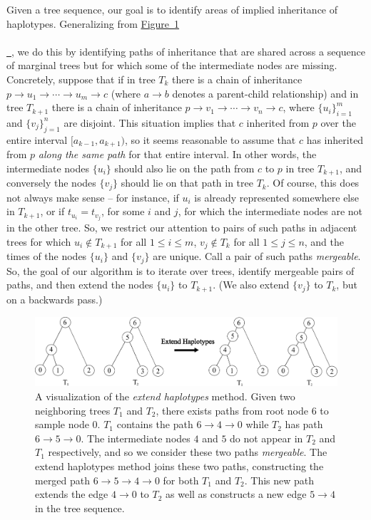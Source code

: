\documentclass[10pt,twoside,lineno]{gsajnl}
\newcommand*{\figref}[2][]{%
	\hyperref[{#2}]{%
		Figure~\ref*{#2}%
		\ifx\\#1\\%
		\else
		\,#1%
		\fi
	}%
}
\begin{document}
Given a tree sequence, our goal is to
identify areas of implied inheritance of haplotypes.
Generalizing from \figref{fig:extending_diagram},
we do this by identifying paths of inheritance that are shared across a sequence of marginal trees
but for which some of the intermediate nodes are missing.
Concretely, suppose that 
if in tree $T_k$ there is a chain of inheritance
$p \to u_1 \to \cdots \to u_m \to c$
(where $a \to b$ denotes a parent-child relationship)
and in tree $T_{k+1}$ there is a chain of inheritance
$p \to v_1 \to \cdots \to v_n \to c$,
where $\{u_i\}_{i=1}^m$ and $\{v_j\}_{j=1}^n$ are disjoint.
This situation implies that $c$ inherited from $p$ over the entire interval $[a_{k-1}, a_{k+1})$,
so it seems reasonable to assume that $c$ has inherited from $p$ \emph{along the same path} for that entire interval.
In other words, the intermediate nodes $\{u_i\}$ should also lie on the path from $c$ to $p$ in tree $T_{k+1}$,
and conversely the nodes $\{v_j\}$ should lie on that path in tree $T_k$.
Of course, this does not always make sense --
for instance, if $u_i$ is already represented somewhere else in $T_{k+1}$,
or if $t_{u_i} = t_{v_j}$, for some $i$ and $j$,
for which the intermediate nodes are not in the other tree.
So, we restrict our attention to pairs of such paths in adjacent trees
for which
$u_i \notin T_{k+1}$ for all $1 \le i \le m$,
$v_j \notin T_k$ for all $1 \le j \le n$,
and the times of the nodes $\{u_i\}$ and $\{v_j\}$ are unique.
Call a pair of such paths \emph{mergeable}.
So, the goal of our algorithm is to iterate over trees,
identify mergeable pairs of paths,
and then extend the nodes $\{u_i\}$ to $T_{k+1}$.
(We also extend $\{v_j\}$ to $T_k$, but on a backwards pass.)

\begin{figure}[!ht]
\begin{center}
	\includegraphics[width=5in]{edge_extend_method.pdf}
\end{center}
\caption{A visualization of the \textit{extend haplotypes} method. Given two neighboring trees $T_1$ and $T_2$, there exists paths from root node $6$ to sample node $0$. $T_1$ contains the path $6\to 4\to 0$ while $T_2$ has path $6\to 5\to 0$. The intermediate nodes $4$ and $5$ do not appear in $T_2$ and $T_1$ respectively, and so we consider these two paths \textit{mergeable}. The extend haplotypes method joins these two paths, constructing the merged path $6\to 5\to 4\to 0$ for both $T_1$ and $T_2$. This new path extends the edge $4\to 0$ to $T_2$ as well as constructs a new edge $5\to 4$ in the tree sequence.
    \label{fig:extending_diagram}
}
\end{figure}
\end{document}

